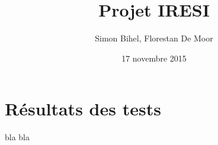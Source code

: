 \documentclass[a4paper,10pt]{article}%
\begin{document}
\title{Projet IRESI}

\author{Simon Bihel, Florestan De Moor}

\date{17 novembre 2015}

\maketitle

\section{Résultats des tests} bla bla
\end{document}
